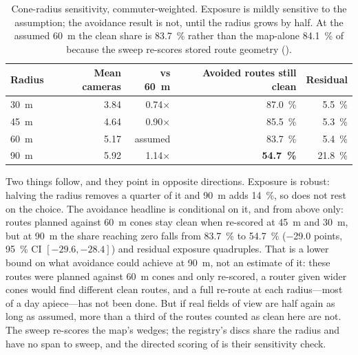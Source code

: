 \documentclass[11pt,twoside]{article}
\begin{document}
\begin{table}[htbp]
\centering
\small
\caption{Cone-radius sensitivity, commuter-weighted. Exposure is mildly sensitive to the
assumption; the avoidance result is not, until the radius grows by half. At the assumed
\SI{60}{\metre} the clean share is \SI{83.7}{\percent} rather than the map-alone
\SI{84.1}{\percent} of  because the sweep re-scores stored route geometry
().}
\label{tab:radius}
\begin{tabular}{lrrrr}
\toprule
Radius & Mean cameras & vs \SI{60}{\metre} & Avoided routes still clean & Residual \\
\midrule
\SI{30}{\metre} & \num{3.84} & \num{0.74}$\times$ & \SI{87.0}{\percent} & \SI{5.5}{\percent} \\
\SI{45}{\metre} & \num{4.64} & \num{0.90}$\times$ & \SI{85.5}{\percent} & \SI{5.3}{\percent} \\
\SI{60}{\metre} & \num{5.17} & assumed            & \SI{83.7}{\percent} & \SI{5.4}{\percent} \\
\SI{90}{\metre} & \num{5.92} & \num{1.14}$\times$ & \textbf{\SI{54.7}{\percent}} & \SI{21.8}{\percent} \\
\bottomrule
\end{tabular}
\end{table}

Two things follow, and they point in opposite directions. Exposure is robust: halving the
radius removes a quarter of it and \SI{90}{\metre} adds \SI{14}{\percent}, so
 does not rest on the choice. The avoidance headline is conditional
on it, and from above only: routes planned against \SI{60}{\metre} cones stay clean when
re-scored at \SI{45}{\metre} and \SI{30}{\metre}, but at \SI{90}{\metre} the share reaching
zero falls from \SI{83.7}{\percent} to \SI{54.7}{\percent} (\num{-29.0} points,
\SI{95}{\percent} CI $[-29.6, -28.4]$) and residual exposure quadruples. That is a lower
bound on what avoidance could achieve at \SI{90}{\metre}, not an estimate of it: these routes
were planned against \SI{60}{\metre} cones and only re-scored, a router given wider cones
would find different clean routes, and a full re-route at each radius---most of a day
apiece---has not been done. But if real fields of view are half again as long as assumed,
more than a third of the routes counted as clean here are not. The sweep re-scores the map's
wedges; the registry's discs share the radius and have no span to sweep, and the directed
scoring of  is their sensitivity check.
\end{document}
